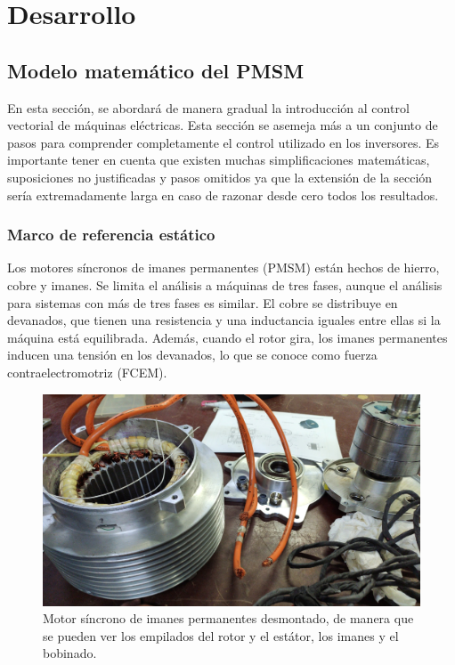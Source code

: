 \chapter{Desarrollo}

\section{Modelo matemático del PMSM}

En esta sección, se abordará de manera gradual la introducción al control vectorial de máquinas eléctricas. Esta sección se asemeja más a un conjunto de pasos para comprender completamente el control utilizado en los inversores. Es importante tener en cuenta que existen muchas simplificaciones matemáticas, suposiciones no justificadas y pasos omitidos ya que la extensión de la sección sería extremadamente larga en caso de razonar desde cero todos los resultados.

\subsection{Marco de referencia estático}

Los motores síncronos de imanes permanentes (PMSM) están hechos de hierro, cobre y imanes. Se limita el análisis a máquinas de tres fases, aunque el análisis para sistemas con más de tres fases es similar. El cobre se distribuye en devanados, que tienen una resistencia y una inductancia iguales entre ellas si la máquina está equilibrada. Además, cuando el rotor gira, los imanes permanentes inducen una tensión en los devanados, lo que se conoce como fuerza contraelectromotriz (FCEM).
\begin{figure}[H]
	\centering
	\includegraphics[width=0.7\linewidth]{fig/MVIMG_20220302_114007.jpg}
	\caption{Motor síncrono de imanes permanentes desmontado, de manera que se pueden ver los empilados del rotor y el estátor, los imanes y el bobinado.}
\end{figure}


